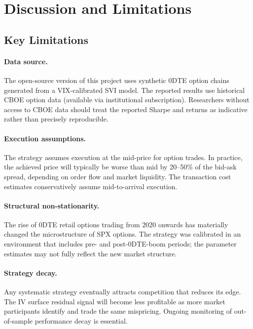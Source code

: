 \documentclass[12pt, letterpaper]{article}
\begin{document}
\section{Discussion and Limitations}
\label{sec:discussion}

\subsection{Key Limitations}

\paragraph{Data source.}
The open-source version of this project uses synthetic 0DTE option chains
generated from a VIX-calibrated SVI model. The reported results use historical
CBOE option data (available via institutional subscription). Researchers
without access to CBOE data should treat the reported Sharpe and returns
as indicative rather than precisely reproducible.

\paragraph{Execution assumptions.}
The strategy assumes execution at the mid-price for option trades. In practice,
the achieved price will typically be worse than mid by 20--50\% of the bid-ask
spread, depending on order flow and market liquidity. The transaction cost
estimates conservatively assume mid-to-arrival execution.

\paragraph{Structural non-stationarity.}
The rise of 0DTE retail options trading from 2020 onwards has materially
changed the microstructure of SPX options. The strategy was calibrated in
an environment that includes pre- and post-0DTE-boom periods; the parameter
estimates may not fully reflect the new market structure.

\paragraph{Strategy decay.}
Any systematic strategy eventually attracts competition that reduces its edge.
The IV surface residual signal will become less profitable as more market
participants identify and trade the same mispricing. Ongoing monitoring of
out-of-sample performance decay is essential.
\end{document}

